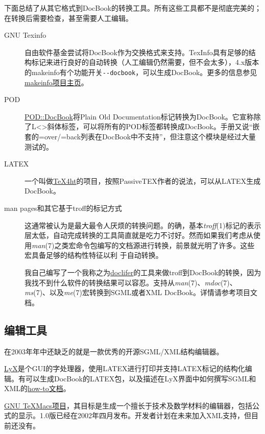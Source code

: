 \documentclass[12pt,oneside]{ctexbook}
\begin{document}
\begin{common-format}
下面总结了从其它格式到DocBook的转换工具。所有这些工具都不是彻底完美的；在转换后需要检查，甚至需要人工编辑。
\begin{description}
\item[GNU Texinfo] 自由软件基金尝试将DocBook作为交换格式来支持。TexInfo具有足够的结构标记来进行良好的自动转换（人工编辑仍然需要，但不会太多），4.x版本的makeinfo有个功能开关\verb+--docbook+，可以生成DocBook。更多的信息参见\href{http://www.gnu.org/directory/texinfo.html}{makeinfo项目主页}。
\item[POD] \href{http://www.cpan.org/modules/by-module/Pod/}{POD::DocBook}将Plain Old Documentation标记转换为DocBook\linebreak 。它宣称除了L<>斜体标签，可以将所有的POD标签都转换成DocBook。手册又说“嵌套的=over/=back列表在DocBook中不支持”，但注意这个模块是经过大量测试的。
\item[LATEX] 一个叫做\href{http://www.lrz-muenchen.de/services/software/sonstiges/tex4ht/mn.html}{TeX4ht}的项目，按照PassiveTEX作者的说法，可以从LATEX生成DocBook。
\item[man pages和其它基于troff的标记方式] 这通常被认为是最大最令人厌烦的转换问题。的确，基本\textit{troff}(1)标记的表示层太低，自动完成转换的工具简直就是吃力不讨好。然而如果我们考虑从使用\textit{man}(7)之类宏命令包编写的文档源进行转换，前景就光明了许多。这些宏具备足够的结构性特征以利
于自动转换。

我自己编写了一个我称之为\href{http://www.catb.org/~esr/doclifter/}{doclifer}的工具来做troff到DocBook的转换，因为我找不到什么软件的转换结果可以容忍。支持从\textit{man}(7)、\textit{mdoc}(7)、\textit{ms}(7)、以及\textit{me}(7)宏转换到SGML或者XML DocBook。详情请参考项目文档。
\end{description}

\subsection{编辑工具}
在2003年年中还缺乏的就是一款优秀的开源SGML/XML结构编辑器。

\href{http://www.lyx.org/}{LyX}是个GUI的字处理器，使用LATEX进行打印并支持LATEX标记的结构化编辑。有可以生成DocBook的LATEX包，以及描述在LyX界面中如何撰写SGML和XML的\href{http://bgu.chez.tiscali.fr/doc/db4lyx/}{how-to文档}。

\href{http://www.math.u-psud.fr/~anh/TeXmacs/TeXmacs.html}{GNU TeXMacs项目}，其目标是生成一个擅长于技术及数学材料的编辑器，包括公式的显示。1.0版已经在2002年四月发布。开发者计划在未来加入XML支持，但目前还没有。


\end{common-format}
\end{document}
